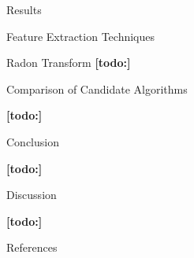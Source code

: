 \documentclass{matthijs}
\begin{document}
\begin{hoofdstuk}{Results}
\begin{paragraaf}{Feature Extraction Techniques}
\begin{subparagraaf}{Radon Transform}
				\textbf{[todo:]}

			\end{subparagraaf}

		\end{paragraaf}

		\begin{paragraaf}{Comparison of Candidate Algorithms}

			\textbf{[todo:]}

		\end{paragraaf}

	\end{hoofdstuk}

	\begin{hoofdstuk}{Conclusion}

		\textbf{[todo:]}

	\end{hoofdstuk}

	\begin{hoofdstuk}{Discussion}

		\textbf{[todo:]}

	\end{hoofdstuk}

	\begin{hoofdstuk}{References}

		\printbibliography[heading=none]
	
	\end{hoofdstuk}

	\clearpage
	\thispagestyle{empty}
	\addtocounter{page}{-1}
	\
	\clearpage
\end{document}

